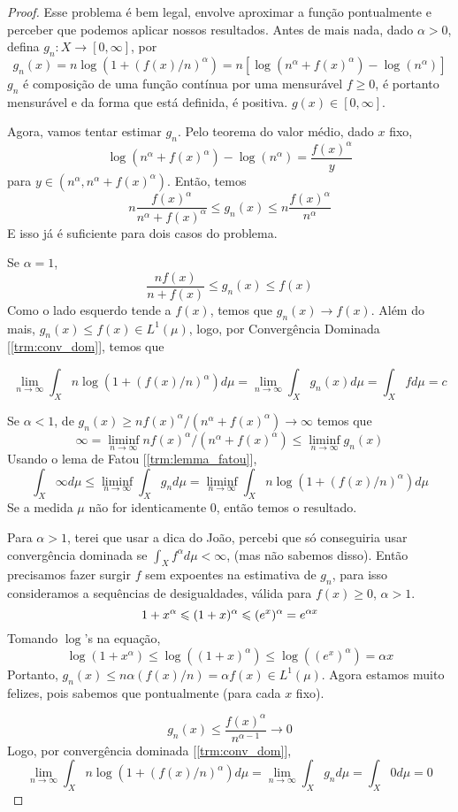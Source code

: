 \begin{problem}
    \label{prob:l2:3}
\end{problem}
\begin{proof}
    
    Esse problema é bem legal, envolve aproximar a função pontualmente e perceber que podemos aplicar nossos resultados. Antes de mais nada, dado $\alpha > 0$, defina $g_n : X \to [0,\infty]$, por 
    $$g_n(x) =n\log(1 + (f(x)/n)^\alpha) = n [\log(n^\alpha + f(x)^\alpha) - \log(n^\alpha)]$$
    $g_n$ é composição de uma função contínua por uma mensurável $f \geq 0$, é portanto mensurável e
    da forma que está definida, é positiva. $g(x) \in [0,\infty]$.

    Agora, vamos tentar estimar $g_n$. Pelo teorema do valor médio, dado $x$ fixo,
    $$\log(n^\alpha + f(x)^\alpha) - \log(n^\alpha) = \frac{f(x)^\alpha}{y}$$
    para $y \in (n^\alpha, n^\alpha + f(x)^\alpha)$.
    Então, temos
    $$n\frac{f(x)^\alpha}{n^\alpha + f(x)^\alpha} \leq g_n(x) \leq n\frac{f(x)^\alpha}{n^\alpha}$$
    E isso já é suficiente para dois casos do problema. 
    
    Se $\alpha = 1$,
    $$\frac{nf(x)}{n + f(x)} \leq g_n(x) \leq f(x)$$
    Como o lado esquerdo tende a $f(x)$, temos que $g_n(x) \to f(x)$. Além do mais, $g_n(x) \leq f(x) \in L^1(\mu)$, logo, por Convergência Dominada [\ref{trm:conv_dom}], temos que
    
    $$\lim_{n\to\infty}\int_X n\log(1 + (f(x)/n)^\alpha)d\mu = \lim_{n\to\infty}\int_X g_n(x)d\mu = \int_X fd\mu = c$$
    
    Se $\alpha < 1$, de $g_n(x) \geq nf(x)^\alpha / (n^\alpha + f(x)^\alpha) \to \infty$
    temos que
    $$ \infty = \liminf_{n\to\infty} nf(x)^\alpha / (n^\alpha + f(x)^\alpha) \leq \liminf_{n\to\infty} g_n(x)$$
    Usando o lema de Fatou [\ref{trm:lemma_fatou}], 
    $$\int_X \infty d\mu \leq \liminf_{n\to\infty}\int_X g_n d\mu = \liminf_{n \to \infty} \int_X n\log(1 + (f(x)/n)^\alpha) d\mu$$
    Se a medida $\mu$ não for identicamente $0$, então temos o resultado.

    
    Para $\alpha > 1$, terei que usar a dica do João, percebi que só conseguiria usar convergência dominada se $\int_X f^\alpha d\mu < \infty$, (mas não sabemos disso). Então precisamos fazer surgir $f$ sem expoentes na estimativa de $g_n$, para isso consideramos a sequências de desigualdades, válida para $f(x) \geq 0$, $\alpha > 1$.
    $$
        1 + x^\alpha \leq (1 + x)^\alpha \leq (e^x)^\alpha = e^{\alpha x}\\
    $$
    Tomando $\log$'s na equação,
    $$
        \log(1 + x^\alpha) \leq \log((1 + x)^\alpha) \leq \log((e^x)^\alpha) = \alpha x
    $$
    Portanto, $g_n(x) \leq n \alpha (f(x)/n) = \alpha f(x) \in L^1(\mu)$. Agora estamos muito felizes, pois sabemos que pontualmente (para cada $x$ fixo).
    
    $$g_n(x) \leq \frac{f(x)^\alpha}{n^{\alpha -1}} \to 0$$
    Logo, por convergência dominada [\ref{trm:conv_dom}],
    $$\lim_{n \to \infty} \int_X n\log(1 + (f(x)/n)^\alpha) d\mu= \lim_{n\to\infty} \int_X g_nd\mu = \int_X 0d\mu = 0$$
\end{proof}


